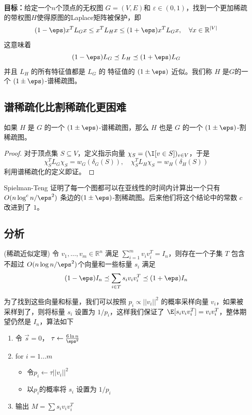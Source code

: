 \documentclass[lang=cn,newtx,10pt,scheme=chinese,chinesefont=nofont,citestyle=gb7714-2015, bibstyle=gb7714-2015]{elegantbook}
\begin{document}
\begin{refsection}
\textbf{目标：}给定一个$n$个顶点的无权图 $G=(V,E)$和 $\varepsilon\in(0,1)$，找到一个更加稀疏的带权图$H$使得原图的Laplace矩阵被保护，即
\[
(1-\eps) x^TL_G x\leq x^TL_H x\leq (1+\eps) x^TL_G x, \quad \forall x\in \mathbb{R}^{|V|}
\]
这意味着
\[
(1-\eps) L_G \preceq L_H \preceq (1+\eps) L_G
\]
并且 $L_H$ 的所有特征值都是 $L_G$ 的 特征值的 $(1\pm\eps)$ 近似。我们称 $H$ 是$G$的一个 $(1\pm\eps)$-谱稀疏图。

\subsection{谱稀疏化比割稀疏化更困难}
\begin{lemma}
    如果 $H$ 是 $G$ 的一个 $(1\pm\eps)$-谱稀疏图，那么 $H$ 也是 $G$ 的一个 $(1\pm\eps)$-割稀疏图。
\end{lemma}
\begin{proof}
    对于顶点集 $S\subseteq V$，定义指示向量 $\chi_S=(\I[v\in S])_{v\in V}$，于是
    \[
    \chi_S^TL_G \chi_S=w_G(\delta_G(S)),\quad 
    \chi_S^TL_H \chi_S=w_H(\delta_H(S))
    \]
    利用谱稀疏化的定义即证。
\end{proof}

Spielman-Teng 证明了每一个图都可以在亚线性的时间内计算出一个只有 $O(n\log^cn/\eps^2)$ 条边的$(1\pm\eps)$-割稀疏图。后来他们将这个结论中的常数 $c$ 改进到了 $1$。

\subsection{分析}
\begin{theorem}{(稀疏近似定理)}
\label{thm:sparse-approx}
    令 $v_1,\dots, v_m\in\mathbb{R}^n$ 满足 $\sum_{i=1}^m v_i v_i^T = I_n$，则存在一个子集 $T$ 包含不超过 $O(n\log n/\eps^2)$个向量和一些标量 $s_i$ 满足
    \[
    (1-\eps)I_n\preceq \sum_{i\in T} s_iv_iv_i^T\preceq (1+\eps)I_n
    \]
\end{theorem}

为了找到这些向量和标量，我们可以按照 $p_i\propto||v_i||^2$ 的概率采样向量 $v_i$，如果被采样到了，则将标量 $s_i$ 设置为 $1/p_i$，这样我们保证了 $\E[s_iv_iv_i^T]=v_iv_i^T$，整体期望仍然是 $I_n$，算法如下
\begin{enumerate}
    \item 令 $\vec{s}=0$， $\tau \gets \frac{6\ln n}{\eps^2}$
    \item for $i=1\dots m$
        \begin{itemize}
            \item 令$p_i\gets \tau ||v_i||^2$
            \item 以$p_i$的概率将 $s_i$ 设置为 $1/p_i$
        \end{itemize}
    \item 输出 $M=\sum s_iv_iv_i^T$
\end{enumerate}


\end{refsection}
\end{document}
